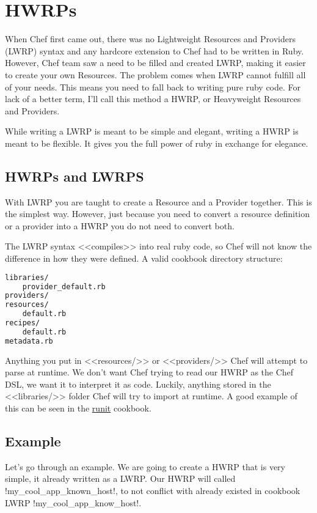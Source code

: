 \section{HWRPs}
\label{sec:cookbook-hwrp}

When Chef first came out, there was no Lightweight Resources and Providers (LWRP) syntax and any hardcore extension to Chef had to be written in Ruby. However, Chef team saw a need to be filled and created LWRP, making it easier to create your own Resources. The problem comes when LWRP cannot fulfill all of your needs. This means you need to fall back to writing pure ruby code. For lack of a better term, I'll call this method a HWRP, or Heavyweight Resources and Providers.

While writing a LWRP is meant to be simple and elegant, writing a HWRP is meant to be flexible. It gives you the full power of ruby in exchange for elegance.

\subsection{HWRPs and LWRPS}

With LWRP you are taught to create a Resource and a Provider together. This is the simplest way. However, just because you need to convert a resource definition or a provider into a HWRP you do not need to convert both.

The LWRP syntax <<compiles>> into real ruby code, so Chef will not know the difference in how they were defined. A valid cookbook directory structure:

\begin{lstlisting}[language=Bash,label=lst:cookbook-hwrp1]
libraries/
    provider_default.rb
providers/
resources/
    default.rb
recipes/
    default.rb
metadata.rb
\end{lstlisting}

Anything you put in <<resources/>> or <<providers/>> Chef will attempt to parse at runtime. We don't want Chef trying to read our HWRP as the Chef DSL, we want it to interpret it as code. Luckily, anything stored in the <<libraries/>> folder Chef will try to import at runtime. A good example of this can be seen in the \href{https://github.com/hw-cookbooks/runit}{runit} cookbook.

\subsection{Example}

Let's go through an example. We are going to create a HWRP that is very simple, it already written as a LWRP. Our HWRP will called \inline!my_cool_app_known_host!, to not conflict with already existed in cookbook LWRP \inline!my_cool_app_know_host!.

